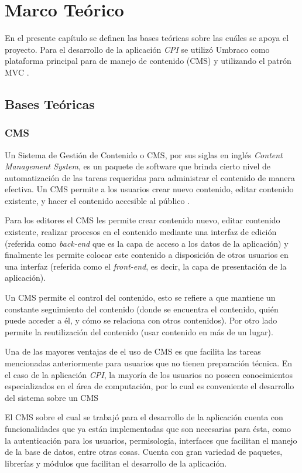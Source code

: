 \chapter{Marco Teórico}
En el presente capítulo se definen las bases teóricas sobre las cuáles se apoya el proyecto. Para el desarrollo de la aplicación \textit{CPI} se utilizó Umbraco \cite{umbraco} como plataforma principal para de manejo de contenido (CMS) \cite{cmsBarker} y utilizando el patrón MVC \cite{mvcKrasner}.

\section{Bases Teóricas}

\subsection{CMS}
Un Sistema de Gestión de Contenido o CMS, por sus siglas en inglés \textit{Content Management System}, es un paquete de software que brinda cierto nivel de automatización de las tareas requeridas para administrar el contenido de manera efectiva. Un CMS permite a los usuarios crear nuevo contenido, editar contenido existente, y hacer el contenido accesible al público \cite{cmsBarker}.

Para los editores el CMS les permite crear contenido nuevo, editar contenido existente, realizar procesos en el contenido mediante una interfaz de edición (referida como \textit{back-end} que es la capa de acceso a los datos de la aplicación) y finalmente les permite colocar este contenido a disposición de otros usuarios en una interfaz (referida como el \textit{front-end}, es decir, la capa de presentación de la aplicación).

Un CMS permite el control del contenido, esto se refiere a que mantiene un constante seguimiento del contenido (donde se encuentra el contenido, quién puede acceder a él, y cómo se relaciona con otros contenidos). Por otro lado permite la reutilización del contenido (usar contenido en más de un lugar).

Una de las mayores ventajas de el uso de CMS es que facilita las tareas mencionadas anteriormente para usuarios que no tienen preparación técnica. En el caso de la aplicación \textit{CPI}, la mayoría de los usuarios no poseen conocimientos especializados en el área de computación, por lo cual es conveniente el desarrollo del sistema sobre un CMS

El CMS sobre el cual se trabajó para el desarrollo de la aplicación cuenta con funcionalidades que ya están implementadas que son necesarias para ésta, como la autenticación para los usuarios, permisología, interfaces que facilitan el manejo de la base de datos, entre otras cosas. Cuenta con gran variedad de paquetes, librerías y módulos que facilitan el desarrollo de la aplicación. 

